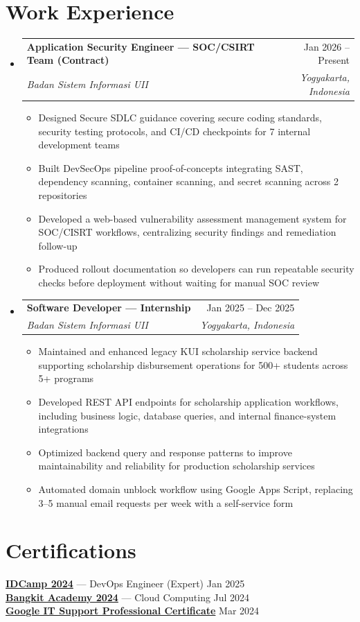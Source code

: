 \documentclass[letterpaper,11pt]{article}
\makeatletter
\newcommand{\resumeItem}[1]{
  \item\small{
    {#1 \vspace{-2pt}}
  }
}
\newcommand{\resumeSubheading}[4]{
  \vspace{-2pt}\item
    \begin{tabular*}{0.97\textwidth}[t]{l@{\extracolsep{\fill}}r}
      \textbf{#1} & #2 \\
      \textit{\small#3} & \textit{\small #4} \\
    \end{tabular*}\vspace{-7pt}
}
\newcommand{\resumeSubHeadingListStart}{\begin{itemize}[leftmargin=0.15in, label={}]}
\newcommand{\resumeSubHeadingListEnd}{\end{itemize}}
\newcommand{\resumeItemListStart}{\begin{itemize}}
\newcommand{\resumeItemListEnd}{\end{itemize}\vspace{-5pt}}
\makeatother
\begin{document}
\section{Work Experience}
  \resumeSubHeadingListStart

    \resumeSubheading
      {Application Security Engineer --- SOC/CSIRT Team (Contract)}{Jan 2026 -- Present}
      {Badan Sistem Informasi UII}{Yogyakarta, Indonesia}
      \resumeItemListStart
        \resumeItem{Designed Secure SDLC guidance covering secure coding standards, security testing protocols, and CI/CD checkpoints for 7 internal development teams}
        \resumeItem{Built DevSecOps pipeline proof-of-concepts integrating SAST, dependency scanning, container scanning, and secret scanning across 2 repositories}
        \resumeItem{Developed a web-based vulnerability assessment management system for SOC/CISRT workflows, centralizing security findings and remediation follow-up}
        \resumeItem{Produced rollout documentation so developers can run repeatable security checks before deployment without waiting for manual SOC review}
      \resumeItemListEnd

    \resumeSubheading
      {Software Developer --- Internship}{Jan 2025 -- Dec 2025}
      {Badan Sistem Informasi UII}{Yogyakarta, Indonesia}
      \resumeItemListStart
        \resumeItem{Maintained and enhanced legacy KUI scholarship service backend supporting scholarship disbursement operations for 500+ students across 5+ programs}
        \resumeItem{Developed REST API endpoints for scholarship application workflows, including business logic, database queries, and internal finance-system integrations}
        \resumeItem{Optimized backend query and response patterns to improve maintainability and reliability for production scholarship services}
        \resumeItem{Automated domain unblock workflow using Google Apps Script, replacing 3--5 manual email requests per week with a self-service form}
      \resumeItemListEnd
  \resumeSubHeadingListEnd

\section{Certifications}
 \begin{itemize}[leftmargin=0.15in, label={}]
    \small{\item{
     \textbf{\href{https://drive.google.com/file/d/190FYroVmyARbiZkc33vzVljwTeKRNs3x/view?usp=sharing}{IDCamp 2024}} --- DevOps Engineer (Expert) \hfill Jan 2025 \\
     \textbf{\href{https://drive.google.com/file/d/1e3psOxecn3Y4ehhnL3ky5UiYhRN6qDQT/view?usp=sharing}{Bangkit Academy 2024}} --- Cloud Computing \hfill Jul 2024 \\
     \textbf{\href{https://coursera.org/share/f0d2d8e9ef9646d4d7490c13b2a2bf44}{Google IT Support Professional Certificate}} \hfill Mar 2024
    }}
 \end{itemize}
\end{document}

